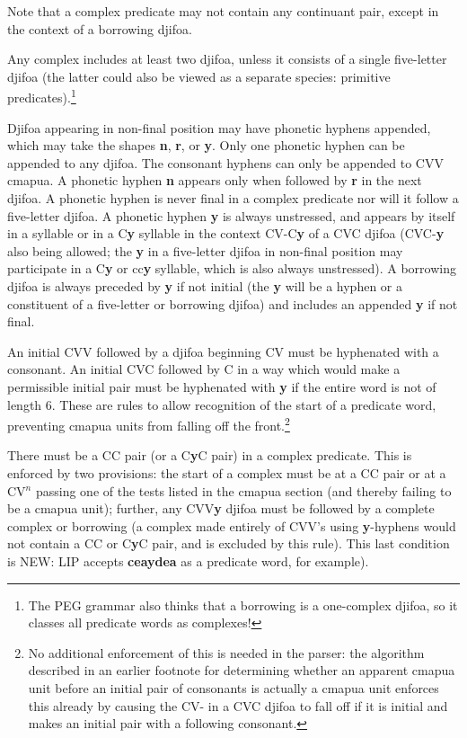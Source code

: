 \documentclass[12pt]{book}
\begin{document}
Note that a complex predicate may not contain any continuant pair, except in the context of a borrowing djifoa.

Any complex includes at least two djifoa, unless it consists of a single five-letter djifoa (the latter could also be viewed as a separate species: primitive predicates).\footnote{The PEG grammar also thinks that a borrowing is a one-complex djifoa, so it classes all predicate words as complexes!}

Djifoa appearing in non-final position may have phonetic hyphens appended, which may take the shapes {\bf n}, {\bf r}, or {\bf y}.   Only one phonetic hyphen can be appended to any djifoa.  The consonant hyphens can only be appended to CVV cmapua.
A phonetic hyphen {\bf n} appears only when followed by {\bf r} in the next djifoa.  A phonetic hyphen is never final in a complex predicate nor will it follow a five-letter djifoa.  A phonetic hyphen {\bf y} is always unstressed, and appears by itself in a syllable or in a C{\bf y} syllable in the context CV-C{\bf y} of a CVC djifoa (CVC-{\bf y} also being allowed;  the {\bf y} in a five-letter djifoa in non-final position may participate in a C{\bf y} or cc{\bf y} syllable, which is also always unstressed).  A borrowing djifoa is always preceded by {\bf y} if not initial (the {\bf y} will be a hyphen or a constituent of a five-letter or borrowing djifoa) and includes an appended {\bf y} if not final.

An initial CVV followed by a djifoa beginning CV must be hyphenated with a consonant.  An initial CVC followed by C in a way which would make
a permissible initial pair must be hyphenated with {\bf y} if the entire word is not of length 6.  These are rules to allow recognition of the start of
a predicate word, preventing cmapua units from falling off the front.\footnote{No additional enforcement of this is needed in the parser:  the algorithm described in an earlier footnote for determining whether an apparent cmapua unit before an initial pair of consonants is actually a cmapua unit enforces this already by causing the CV- in a CVC djifoa to fall off if it is initial and makes an initial pair with a following consonant.}

There must be a CC pair (or a C{\bf y}C pair) in a complex predicate.  This is enforced by two provisions:  the start of a complex must be at a CC pair or
at a CV$^n$ passing one of the tests listed in the cmapua section (and thereby failing to be a cmapua unit);  further, any CVV{\bf y} djifoa must be followed by a complete complex or borrowing  (a complex made entirely of CVV's using {\bf y}-hyphens would not contain a CC or C{\bf y}C pair, and is excluded by this rule).  This last condition is NEW:
LIP accepts {\bf ceaydea} as a predicate word, for example).
\end{document}
